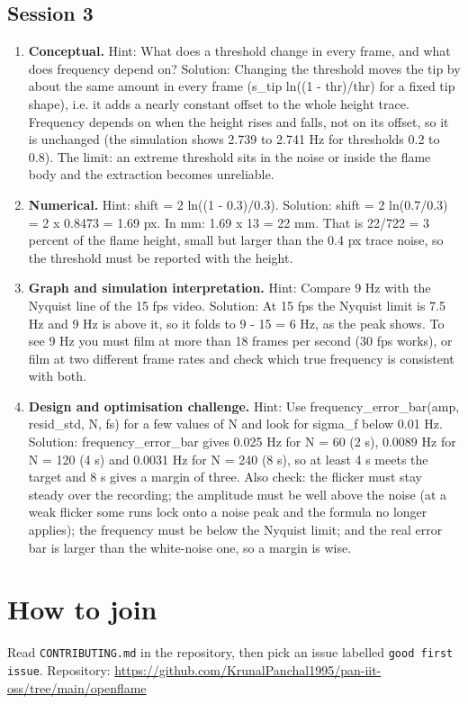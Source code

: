 \documentclass[11pt,a4paper]{article}
\begin{document}
\subsection*{Session 3}
\begin{enumerate}[nosep]
\item \textbf{Conceptual.} Hint: What does a threshold change in every frame, and what does frequency depend on? Solution: Changing the threshold moves the tip by about the same amount in every frame (s\_tip ln((1 - thr)/thr) for a fixed tip shape), i.e. it adds a nearly constant offset to the whole height trace. Frequency depends on when the height rises and falls, not on its offset, so it is unchanged (the simulation shows 2.739 to 2.741 Hz for thresholds 0.2 to 0.8). The limit: an extreme threshold sits in the noise or inside the flame body and the extraction becomes unreliable.
\item \textbf{Numerical.} Hint: shift = 2 ln((1 - 0.3)/0.3). Solution: shift = 2 ln(0.7/0.3) = 2 x 0.8473 = 1.69 px. In mm: 1.69 x 13 = 22 mm. That is 22/722 = 3 percent of the flame height, small but larger than the 0.4 px trace noise, so the threshold must be reported with the height.
\item \textbf{Graph and simulation interpretation.} Hint: Compare 9 Hz with the Nyquist line of the 15 fps video. Solution: At 15 fps the Nyquist limit is 7.5 Hz and 9 Hz is above it, so it folds to \textbar{}9 - 15\textbar{} = 6 Hz, as the peak shows. To see 9 Hz you must film at more than 18 frames per second (30 fps works), or film at two different frame rates and check which true frequency is consistent with both.
\item \textbf{Design and optimisation challenge.} Hint: Use frequency\_error\_bar(amp, resid\_std, N, fs) for a few values of N and look for sigma\_f below 0.01 Hz. Solution: frequency\_error\_bar gives 0.025 Hz for N = 60 (2 s), 0.0089 Hz for N = 120 (4 s) and 0.0031 Hz for N = 240 (8 s), so at least 4 s meets the target and 8 s gives a margin of three. Also check: the flicker must stay steady over the recording; the amplitude must be well above the noise (at a weak flicker some runs lock onto a noise peak and the formula no longer applies); the frequency must be below the Nyquist limit; and the real error bar is larger than the white-noise one, so a margin is wise.
\end{enumerate}

\section{How to join}
Read \texttt{CONTRIBUTING.md} in the repository, then pick an issue labelled \texttt{good first issue}. Repository: \url{https://github.com/KrunalPanchal1995/pan-iit-oss/tree/main/openflame}
\end{document}
